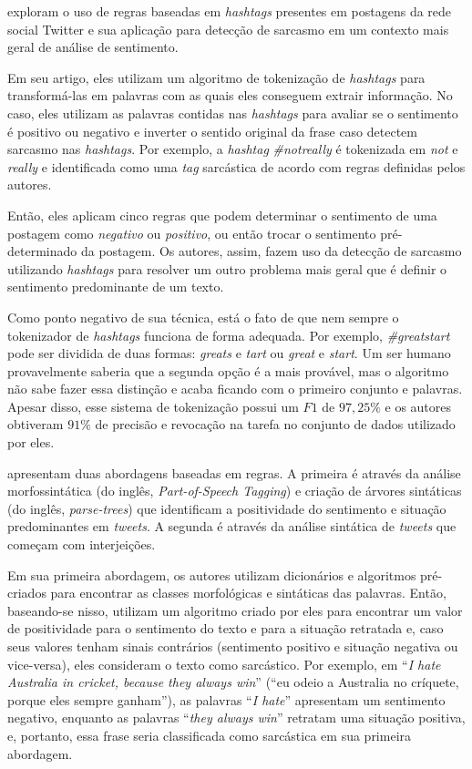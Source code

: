 \cite{maynard-greenwood:2014:cares} exploram o uso de regras baseadas em
\textit{hashtags} presentes em postagens da rede social Twitter e sua aplicação
para detecção de sarcasmo em um contexto mais geral de análise de sentimento.

Em seu artigo, eles utilizam um algoritmo de tokenização de \textit{hashtags}
para transformá-las em palavras com as quais eles conseguem extrair informação.
No caso, eles utilizam as palavras contidas nas \textit{hashtags} para avaliar
se o sentimento é positivo ou negativo e inverter o sentido original da frase
caso detectem sarcasmo nas \textit{hashtags}. Por exemplo, a \textit{hashtag}
\textit{\#notreally} é tokenizada em \textit{not} e \textit{really} e
identificada como uma \textit{tag} sarcástica de acordo com regras definidas
pelos autores.

Então, eles aplicam cinco regras que podem determinar o sentimento de uma
postagem como \textit{negativo} ou \textit{positivo}, ou então trocar o
sentimento pré-determinado da postagem. Os autores, assim, fazem uso da detecção
de sarcasmo utilizando \textit{hashtags} para resolver um outro problema mais
geral que é definir o sentimento predominante de um texto.

Como ponto negativo de sua técnica, está o fato de que nem sempre o tokenizador
de \textit{hashtags} funciona de forma adequada. Por exemplo,
\textit{\#greatstart} pode ser dividida de duas formas: \textit{greats} e
\textit{tart} ou \textit{great} e \textit{start}. Um ser humano provavelmente
saberia que a segunda opção é a mais provável, mas o algoritmo não sabe fazer
essa distinção e acaba ficando com o primeiro conjunto e palavras. Apesar disso,
esse sistema de tokenização possui um $F1$ de $97,25\%$ e os autores obtiveram
$91\%$ de precisão e revocação na tarefa no conjunto de dados utilizado por
eles.

\cite{bharti-etal:2015:parsing-sarcasm} apresentam duas abordagens baseadas em
regras. A primeira é através da análise morfossintática (do inglês,
\textit{Part-of-Speech Tagging}) e criação de árvores sintáticas (do inglês,
\textit{parse-trees}) que identificam a positividade do sentimento e situação
predominantes em \textit{tweets}. A segunda é através da análise sintática de
\textit{tweets} que começam com interjeições.

Em sua primeira abordagem, os autores utilizam dicionários e algoritmos
pré-criados para encontrar as classes morfológicas e sintáticas das palavras.
Então, baseando-se nisso, utilizam um algoritmo criado por eles para
encontrar um valor de positividade para o sentimento do texto e para a situação
retratada e, caso seus valores tenham sinais contrários (sentimento positivo e
situação negativa ou vice-versa), eles consideram o texto como sarcástico. Por
exemplo, em ``\textit{I hate Australia in cricket, because they always win}''
(``eu odeio a Australia no críquete, porque eles sempre ganham''), as palavras
``\textit{I hate}'' apresentam um sentimento negativo, enquanto as palavras
``\textit{they always win}'' retratam uma situação positiva, e, portanto, essa
frase seria classificada como sarcástica em sua primeira abordagem.

